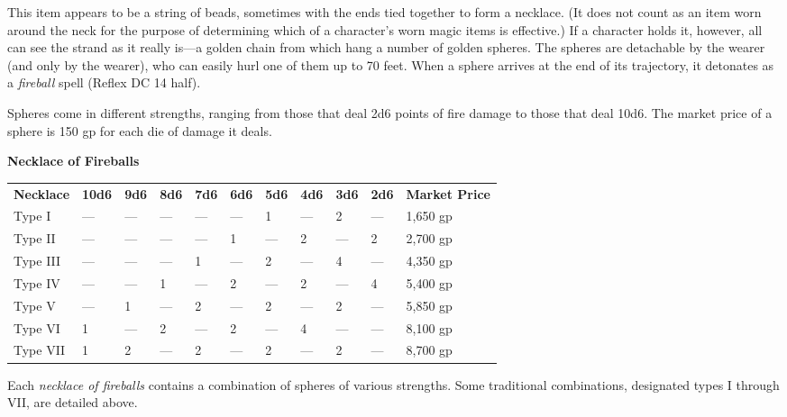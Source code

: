This item appears to be a string of beads, sometimes with the ends tied together to form a necklace. (It does not count as an item worn around the neck for the purpose of determining which of a character's worn magic items is effective.) If a character holds it, however, all can see the strand as it really is---a golden chain from which hang a number of golden spheres. The spheres are detachable by the wearer (and only by the wearer), who can easily hurl one of them up to 70 feet. When a sphere arrives at the end of its trajectory, it detonates as a\textit{ fireball} spell (Reflex DC 14 half).
				
Spheres come in different strengths, ranging from those that deal 2d6 points of fire damage to those that deal 10d6. The market price of a sphere is 150 gp for each die of damage it deals.
\begin{table}[]
\sffamily
\textbf{Necklace of Fireballs}
\begin{tabular}{lllllllllll}
\textbf{Necklace} & \textbf{10d6} & \textbf{9d6} & \textbf{8d6} & \textbf{7d6} & \textbf{6d6} & \textbf{5d6} & \textbf{4d6} & \textbf{3d6} & \textbf{2d6} & \textbf{Market Price} \\
Type I            & —             & —            & —            & —            & —            & 1            & —            & 2            & —            & 1,650 gp              \\
Type II           & —             & —            & —            & —            & 1            & —            & 2            & —            & 2            & 2,700 gp              \\
Type III          & —             & —            & —            & 1            & —            & 2            & —            & 4            & —            & 4,350 gp              \\
Type IV           & —             & —            & 1            & —            & 2            & —            & 2            & —            & 4            & 5,400 gp              \\
Type V            & —             & 1            & —            & 2            & —            & 2            & —            & 2            & —            & 5,850 gp              \\
Type VI           & 1             & —            & 2            & —            & 2            & —            & 4            & —            & —            & 8,100 gp              \\
Type VII          & 1             & 2            & —            & 2            & —            & 2            & —            & 2            & —            & 8,700 gp             
\end{tabular}
\end{table}				
Each \textit{necklace of fireballs} contains a combination of spheres of various strengths. Some traditional combinations, designated types I through VII, are detailed above.
				
